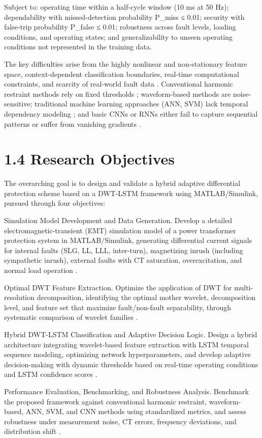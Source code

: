 Subject to: operating time within a half-cycle window (10 ms at 50 Hz); dependability with missed-detection probability P\_miss ≤ 0.01; security with false-trip probability P\_false ≤ 0.01; robustness across fault levels, loading conditions, and operating states; and generalizability to unseen operating conditions not represented in the training data.

The key difficulties arise from the highly nonlinear and non-stationary feature space, context-dependent classification boundaries, real-time computational constraints, and scarcity of real-world fault data \cite{ref15}. Conventional harmonic restraint methods rely on fixed thresholds \cite{ref16}; waveform-based methods are noise-sensitive; traditional machine learning approaches (ANN, SVM) lack temporal dependency modeling \cite{ref17}; and basic CNNs or RNNs either fail to capture sequential patterns or suffer from vanishing gradients \cite{ref18}.


\section{1.4  Research Objectives}
The overarching goal is to design and validate a hybrid adaptive differential protection scheme based on a DWT-LSTM framework using MATLAB/Simulink, pursued through four objectives:

Simulation Model Development and Data Generation. Develop a detailed electromagnetic-transient (EMT) simulation model of a power transformer protection system in MATLAB/Simulink, generating differential current signals for internal faults (SLG, LL, LLL, inter-turn), magnetizing inrush (including sympathetic inrush), external faults with CT saturation, overexcitation, and normal load operation \cite{ref19}.

Optimal DWT Feature Extraction. Optimize the application of DWT for multi-resolution decomposition, identifying the optimal mother wavelet, decomposition level, and feature set that maximize fault/non-fault separability, through systematic comparison of wavelet families \cite{ref20}.

Hybrid DWT-LSTM Classification and Adaptive Decision Logic. Design a hybrid architecture integrating wavelet-based feature extraction with LSTM temporal sequence modeling, optimizing network hyperparameters, and develop adaptive decision-making with dynamic thresholds based on real-time operating conditions and LSTM confidence scores \cite{ref1, ref2}.

Performance Evaluation, Benchmarking, and Robustness Analysis. Benchmark the proposed framework against conventional harmonic restraint, waveform-based, ANN, SVM, and CNN methods using standardized metrics, and assess robustness under measurement noise, CT errors, frequency deviations, and distribution shift \cite{ref3, ref21}.


